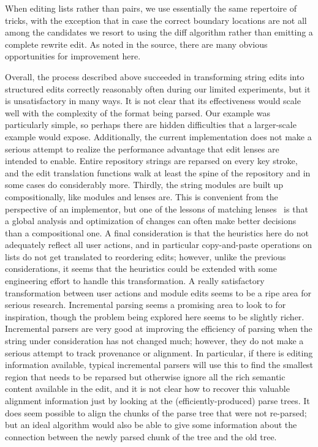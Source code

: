 When editing lists rather than pairs, we use essentially the same repertoire
of tricks, with the exception that in case the correct boundary locations
are not all among the candidates we resort to using the diff algorithm
rather than emitting a complete rewrite edit. As noted in the source, there
are many obvious opportunities for improvement here.

Overall, the process described above succeeded in transforming string edits
into structured edits correctly reasonably often during our limited
experiments, but it is unsatisfactory in many ways. It is not clear that its
effectiveness would scale well with the complexity of the format being
parsed. Our example was particularly simple, so perhaps there are hidden
difficulties that a larger-scale example would expose. Additionally, the
current implementation does not make a serious attempt to realize the
performance advantage that edit lenses are intended to enable. Entire
repository strings are reparsed on every key stroke, and the edit
translation functions walk at least the spine of the repository and in some
cases do considerably more. Thirdly, the string modules are built up
compositionally, like modules and lenses are. This is convenient from the
perspective of an implementor, but one of the lessons of matching
lenses~\cite{Matching10} is that a global analysis and optimization of
changes can often make better decisions than a compositional one. A final
consideration is that the heuristics here do not adequately reflect all user
actions, and in particular copy-and-paste operations on lists do not get
translated to reordering edits; however, unlike the previous considerations,
it seems that the heuristics could be extended with some engineering effort
to handle this transformation. A really satisfactory transformation between
user actions and module edits seems to be a ripe area for serious research.
Incremental parsing seems a promising area to look to for inspiration,
though the problem being explored here seems to be slightly richer.
Incremental parsers are very good at improving the efficiency of parsing
when the string under consideration has not changed much; however, they do
not make a serious attempt to track provenance or alignment. In particular,
if there is editing information available, typical incremental parsers will
use this to find the smallest region that needs to be reparsed but otherwise
ignore all the rich semantic content available in the edit, and it is not
clear how to recover this valuable alignment information just by looking at
the (efficiently-produced) parse trees. It does seem possible to align the
chunks of the parse tree that were not re-parsed; but an ideal algorithm
would also be able to give some information about the connection between the
newly parsed chunk of the tree and the old tree.

